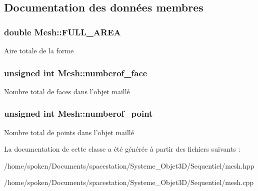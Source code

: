 \subsection{Documentation des données membres}
\hypertarget{class_mesh_a0e1f18abe6ea5a9943e6f8e672f8b037}{
\subsubsection[{F\-U\-L\-L\-\_\-\-A\-R\-E\-A}]{\setlength{\rightskip}{0pt plus 5cm}double Mesh\-::\-F\-U\-L\-L\-\_\-\-A\-R\-E\-A\hspace{0.3cm}{\ttfamily [private]}}}\label{class_mesh_a0e1f18abe6ea5a9943e6f8e672f8b037}
Aire totale de la forme \hypertarget{class_mesh_a8ad7f6788ff772d5e0e17e992571f364}{
\subsubsection[{numberof\-\_\-face}]{\setlength{\rightskip}{0pt plus 5cm}unsigned int Mesh\-::numberof\-\_\-face\hspace{0.3cm}{\ttfamily [private]}}}\label{class_mesh_a8ad7f6788ff772d5e0e17e992571f364}
Nombre total de faces dans l'objet maillé \hypertarget{class_mesh_a9c058bf3f414b6119d7e6ea09703057d}{
\subsubsection[{numberof\-\_\-point}]{\setlength{\rightskip}{0pt plus 5cm}unsigned int Mesh\-::numberof\-\_\-point\hspace{0.3cm}{\ttfamily [private]}}}\label{class_mesh_a9c058bf3f414b6119d7e6ea09703057d}
Nombre total de points dans l'objet maillé 

La documentation de cette classe a été générée à partir des fichiers suivants \-:\begin{DoxyCompactItemize}
\item 
/home/spoken/\-Documents/spacestation/\-Systeme\-\_\-\-Objet3\-D/\-Sequentiel/mesh.\-hpp\item 
/home/spoken/\-Documents/spacestation/\-Systeme\-\_\-\-Objet3\-D/\-Sequentiel/mesh.\-cpp\end{DoxyCompactItemize}

